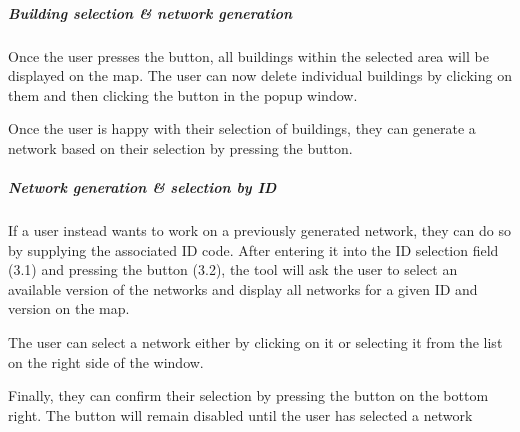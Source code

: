 \documentclass[letterpaper,10pt,english]{sphinxmanual}
\begin{document}
\subparagraph{Building selection \& network generation}
\label{\detokenize{docs_gui/usage/postcode_editor:building-selection-network-generation}}
\noindent{}

\noindent{}

\begin{DUlineblock}{0em}
\item[] Once the user presses the  button, all buildings within the selected area will be displayed on the map. The user can now delete
individual buildings by clicking on them and then clicking the  button in the popup window.
\item[] Once the user is happy with their selection of buildings, they can generate a network based on their selection by pressing the  button.
\end{DUlineblock}


\subparagraph{Network generation \& selection by ID}
\label{\detokenize{docs_gui/usage/postcode_editor:network-generation-selection-by-id}}
\noindent{}

\noindent{}

\begin{DUlineblock}{0em}
\item[] If a user instead wants to work on a previously generated network, they can do so by supplying the associated ID code.
After entering it into the ID selection field (3.1) and pressing the  button (3.2), the tool will ask the user to select an available
version of the networks and display all networks for a given ID and version on the map.
\item[] The user can select a network either by clicking on it or selecting it from the list on the right side of the window.
\item[] Finally, they can confirm their selection by pressing the  button on the bottom right. The button will remain disabled until
the user has selected a network
\end{DUlineblock}

\sphinxstepscope
\end{document}
